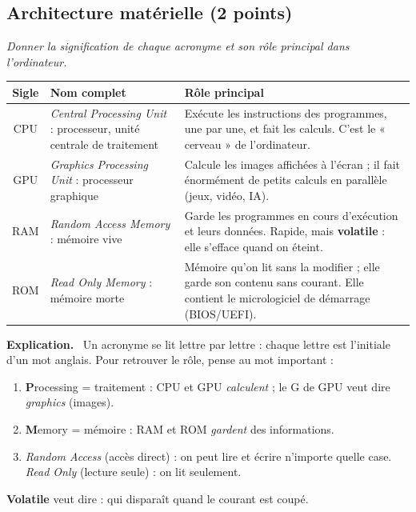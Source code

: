\documentclass[addpoints, 11pt]{exam}
\newcommand{\enonce}[1]{\textit{#1}\par\smallskip}
\newcommand{\explication}{\par\smallskip\noindent\textbf{Explication.}\ }
\DeclareRobustCommand{\_}{\textunderscore\allowbreak}
\begin{document}
\begin{questions}

\section{Architecture matérielle (2 points)}

\question[2] \enonce{Donner la signification de chaque acronyme et son rôle principal dans l'ordinateur.}

\begin{reponse}
\begin{tabular}{|c|p{4.3cm}|p{8.2cm}|}
\hline
\textbf{Sigle} & \textbf{Nom complet} & \textbf{Rôle principal} \\ \hline
CPU & \textit{Central Processing Unit} : processeur, unité centrale de traitement & Exécute les instructions des programmes, une par une, et fait les calculs. C'est le « cerveau » de l'ordinateur. \\ \hline
GPU & \textit{Graphics Processing Unit} : processeur graphique & Calcule les images affichées à l'écran ; il fait énormément de petits calculs en parallèle (jeux, vidéo, IA). \\ \hline
RAM & \textit{Random Access Memory} : mémoire vive & Garde les programmes en cours d'exécution et leurs données. Rapide, mais \textbf{volatile} : elle s'efface quand on éteint. \\ \hline
ROM & \textit{Read Only Memory} : mémoire morte & Mémoire qu'on lit sans la modifier ; elle garde son contenu sans courant. Elle contient le micrologiciel de démarrage (BIOS/UEFI). \\ \hline
\end{tabular}
\end{reponse}

\explication
Un acronyme se lit lettre par lettre : chaque lettre est l'initiale d'un mot anglais. Pour retrouver le rôle, pense au mot important :
\begin{enumerate}
  \item \textbf{P}rocessing = traitement : CPU et GPU \emph{calculent} ; le G de GPU veut dire \emph{graphics} (images).
  \item \textbf{M}emory = mémoire : RAM et ROM \emph{gardent} des informations.
  \item \textit{Random Access} (accès direct) : on peut lire et écrire n'importe quelle case. \textit{Read Only} (lecture seule) : on lit seulement.
\end{enumerate}
\textbf{Volatile} veut dire : qui disparaît quand le courant est coupé.


\end{questions}
\end{document}
